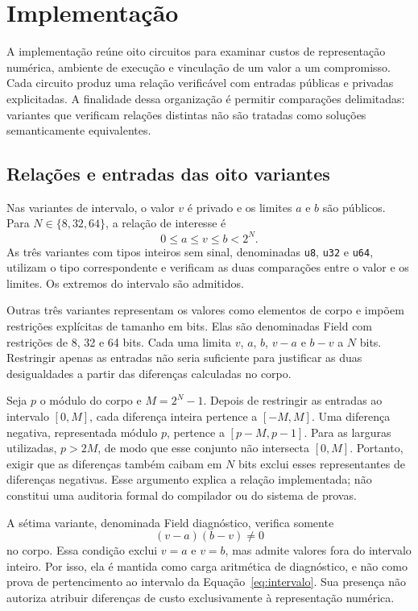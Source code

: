 \chapter{Implementação}
\label{cap:implementacao}

A implementação reúne oito circuitos para examinar custos de representação numérica, ambiente de execução e vinculação de um valor a um compromisso. Cada circuito produz uma relação verificável com entradas públicas e privadas explicitadas. A finalidade dessa organização é permitir comparações delimitadas: variantes que verificam relações distintas não são tratadas como soluções semanticamente equivalentes.

\section{Relações e entradas das oito variantes}

Nas variantes de intervalo, o valor $v$ é privado e os limites $a$ e $b$ são públicos. Para $N\in\{8,32,64\}$, a relação de interesse é
\begin{equation}
  0\leq a\leq v\leq b<2^N.
  \label{eq:intervalo}
\end{equation}
As três variantes com tipos inteiros sem sinal, denominadas \texttt{u8}, \texttt{u32} e \texttt{u64}, utilizam o tipo correspondente e verificam as duas comparações entre o valor e os limites. Os extremos do intervalo são admitidos.

Outras três variantes representam os valores como elementos de corpo e impõem restrições explícitas de tamanho em bits. Elas são denominadas Field com restrições de 8, 32 e 64 bits. Cada uma limita $v$, $a$, $b$, $v-a$ e $b-v$ a $N$ bits. Restringir apenas as entradas não seria suficiente para justificar as duas desigualdades a partir das diferenças calculadas no corpo.

Seja $p$ o módulo do corpo e $M=2^N-1$. Depois de restringir as entradas ao intervalo $[0,M]$, cada diferença inteira pertence a $[-M,M]$. Uma diferença negativa, representada módulo $p$, pertence a $[p-M,p-1]$. Para as larguras utilizadas, $p>2M$, de modo que esse conjunto não intersecta $[0,M]$. Portanto, exigir que as diferenças também caibam em $N$ bits exclui esses representantes de diferenças negativas. Esse argumento explica a relação implementada; não constitui uma auditoria formal do compilador ou do sistema de provas.

A sétima variante, denominada Field diagnóstico, verifica somente
\begin{equation}
  (v-a)(b-v)\neq 0
\end{equation}
no corpo. Essa condição exclui $v=a$ e $v=b$, mas admite valores fora do intervalo inteiro. Por isso, ela é mantida como carga aritmética de diagnóstico, e não como prova de pertencimento ao intervalo da Equação~\ref{eq:intervalo}. Sua presença não autoriza atribuir diferenças de custo exclusivamente à representação numérica.

